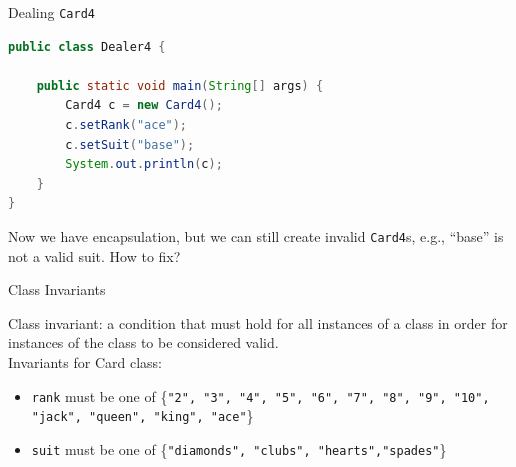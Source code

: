 \documentclass{beamer}
\begin{document}
\begin{frame}[fragile]{Dealing {\tt Card4}}


\begin{lstlisting}[language=Java]
public class Dealer4 {

    public static void main(String[] args) {
        Card4 c = new Card4();
        c.setRank("ace");
        c.setSuit("base");
        System.out.println(c);
    }
}
\end{lstlisting}

Now we have encapsulation, but we can still create invalid {\tt Card4}s, e.g., ``base'' is not a valid suit.  How to fix?

\end{frame}

\begin{frame}[fragile]{Class Invariants}


Class invariant: a condition that must hold for all instances of a class in order for instances of the class to be considered valid.\\
\vspace{.1in}
Invariants for Card class:
\begin{itemize}
\item {\tt rank} must be one of \{{\tt "2", "3", "4", "5", "6", "7", "8", "9",
         "10", "jack", "queen", "king", "ace"}\}
\item {\tt suit} must be one of \{{\tt "diamonds", "clubs", "hearts","spades"}\}
\end{itemize}


\end{frame}
\end{document}
